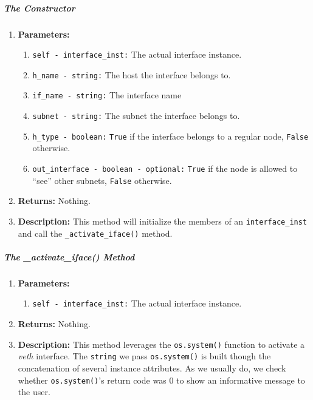         \subparagraph{The Constructor}
            \begin{enumerate}
                \item \textbf{Parameters:}
                \begin{enumerate}
                    \item \texttt{self - interface\_inst:} The actual interface instance.
                    \item \texttt{h\_name - string:} The host the interface belongs to.
                    \item \texttt{if\_name - string:} The interface name
                    \item \texttt{subnet - string:} The subnet the interface belongs to.
                    \item \texttt{h\_type - boolean:} \texttt{True} if the interface belongs to a regular node, \texttt{False} otherwise.
                    \item \texttt{out\_interface - boolean - optional:} \texttt{True} if the node is allowed to ``see'' other subnets, \texttt{False} otherwise.
                \end{enumerate}
                \item \textbf{Returns:} Nothing.
                \item \textbf{Description:} This method will initialize the members of an \texttt{interface\_inst} and call the \texttt{\_activate\_iface()} method.
            \end{enumerate}

        \subparagraph{The \_activate\_iface() Method}
            \begin{enumerate}
                \item \textbf{Parameters:}
                \begin{enumerate}
                    \item \texttt{self - interface\_inst:} The actual interface instance.
                \end{enumerate}
                \item \textbf{Returns:} Nothing.
                \item \textbf{Description:} This method leverages the \texttt{os.system()} function to activate a \textit{veth} interface. The \texttt{string} we pass \texttt{os.system()} is built though the concatenation of several instance attributes. As we usually do, we check whether \texttt{os.system()}'s return code was $0$ to show an informative message to the user.
            \end{enumerate}

